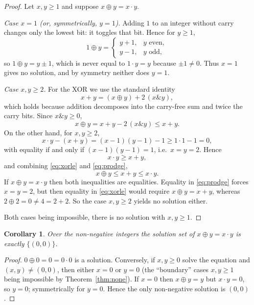 \documentclass[11pt]{article}
\newtheorem{corollary}[theorem]{Corollary}
\theoremstyle{definition}
\newcommand{\xor}{\oplus}
\begin{document}
\begin{proof}
Let $x, y \ge 1$ and suppose $x \xor y = x \cdot y$.

\emph{Case $x = 1$ (or, symmetrically, $y = 1$).}  Adding $1$ to an integer
without carry changes only the lowest bit: it toggles that bit.  Hence for
$y \ge 1$,
\[
  1 \xor y =
  \begin{cases}
    y + 1, & y \text{ even},\\
    y - 1, & y \text{ odd},
  \end{cases}
\]
so $1 \xor y = y \pm 1$, which is never equal to $1 \cdot y = y$ because
$\pm 1 \ne 0$.  Thus $x = 1$ gives no solution, and by symmetry neither does
$y = 1$.

\emph{Case $x, y \ge 2$.}  For the XOR we use the standard identity
\[
  x + y = (x \xor y) + 2\,(x \mathbin{\&} y),
\]
which holds because addition decomposes into the carry-free sum and twice the
carry bits.  Since $x \mathbin{\&} y \ge 0$,
\begin{equation}\label{eq:xorle}
  x \xor y = x + y - 2\,(x \mathbin{\&} y) \le x + y .
\end{equation}
On the other hand, for $x, y \ge 2$,
\[
  x \cdot y - (x + y) = (x - 1)(y - 1) - 1 \ge 1 \cdot 1 - 1 = 0 ,
\]
with equality if and only if $(x - 1)(y - 1) = 1$, i.e.\ $x = y = 2$.  Hence
\begin{equation}\label{eq:prodge}
  x \cdot y \ge x + y ,
\end{equation}
and combining \eqref{eq:xorle} and \eqref{eq:prodge},
\[
  x \xor y \le x + y \le x \cdot y .
\]
If $x \xor y = x \cdot y$ then both inequalities are equalities.  Equality in
\eqref{eq:prodge} forces $x = y = 2$, but then equality in \eqref{eq:xorle}
would require $x \xor y = x + y$, whereas $2 \xor 2 = 0 \ne 4 = 2 + 2$.  So
the case $x, y \ge 2$ yields no solution either.

Both cases being impossible, there is no solution with $x, y \ge 1$.
\end{proof}

\begin{corollary}
Over the non-negative integers the solution set of $x \xor y = x \cdot y$ is
exactly $\{(0,0)\}$.
\end{corollary}

\begin{proof}
$0 \xor 0 = 0 = 0 \cdot 0$ is a solution.  Conversely, if $x, y \ge 0$ solve
the equation and $(x, y) \ne (0,0)$, then either $x = 0$ or $y = 0$ (the
``boundary'' cases $x, y \ge 1$ being impossible by
Theorem~\ref{thm:none}).  If $x = 0$ then $x \xor y = y$ but
$x \cdot y = 0$, so $y = 0$; symmetrically for $y = 0$.  Hence the only
non-negative solution is $(0,0)$.
\end{proof}
\end{document}
